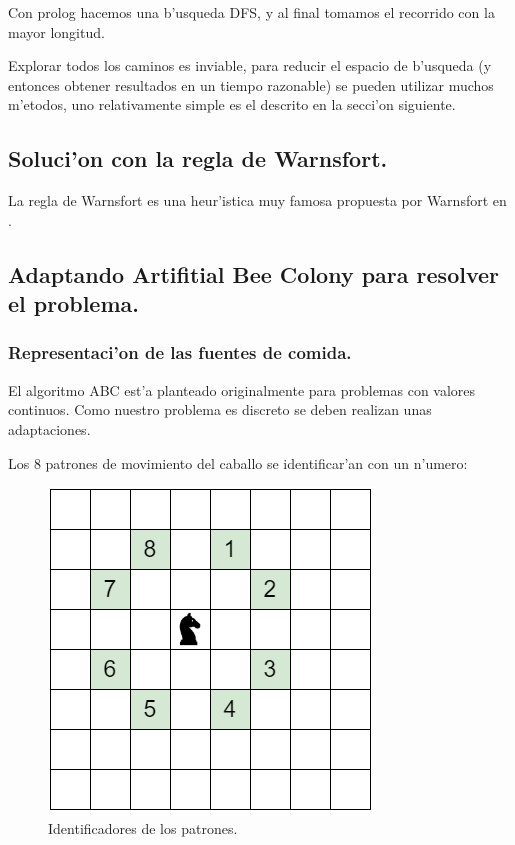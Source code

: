 \documentclass[12pt]{article}
\begin{document}
    Con prolog hacemos una b'usqueda DFS, y al final tomamos
    el recorrido con la mayor longitud.

    Explorar todos los caminos es inviable, para reducir el espacio
    de b'usqueda (y entonces obtener resultados en un tiempo razonable)
    se pueden utilizar muchos m'etodos, uno relativamente
    simple es el descrito en la secci'on siguiente.



    \subsection{Soluci'on con la regla de Warnsfort.}
    La regla de Warnsfort es una heur'istica
    muy famosa propuesta por Warnsfort en .


    \subsection{Adaptando Artifitial Bee Colony para resolver el problema.}

    \subsubsection{Representaci'on de las fuentes de comida.}

    El algoritmo ABC est'a planteado originalmente para problemas con valores continuos. Como nuestro problema es discreto
    se deben realizan unas adaptaciones.


    Los 8 patrones de movimiento del caballo se identificar'an con un n'umero:
    \begin{figure}[H]
        \centering
        \includegraphics[scale=0.5]{id_move.png}
        \caption{Identificadores de los patrones.}
        \label{fig:id_move}
    \end{figure}
\end{document}
